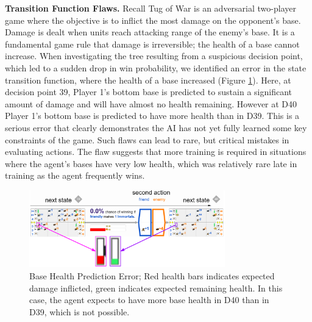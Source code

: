 \documentclass{article}
\begin{document}

{\bf Transition Function Flaws.} Recall Tug of War is an adversarial two-player game where the objective is to inflict the most damage on the opponent’s base. Damage is dealt when units reach attacking range of the enemy’s base. It is a fundamental game rule that damage is irreversible; the health of a base cannot increase. When investigating the tree resulting from a suspicious decision point, which led to a sudden drop in win probability, we identified an error in the state transition function, where the health of a base increased (Figure \ref{fig:HPError}). Here, at decision point 39, Player 1's bottom base is predicted to sustain a significant amount of damage and will have almost no health remaining. However at D40 Player 1's bottom base is predicted to have more health than in D39. This is a serious error that clearly demonstrates the AI has not yet fully learned some key constraints of the game. Such flaws can lead to rare, but critical mistakes in evaluating actions. The flaw suggests that more training is required in situations where the agent's bases have very low health, which was relatively rare late in training as the agent frequently wins. 

\begin{figure}[t]
    \centering
    \includegraphics[width=8.5cm]{img/bugs/HPRises.PNG}
    \caption{Base Health Prediction Error; Red health bars indicates expected damage inflicted, green indicates expected remaining health. In this case, the agent expects to have more base health in D40 than in D39, which is not possible.}
    \label{fig:HPError}
\end{figure}
\end{document}
